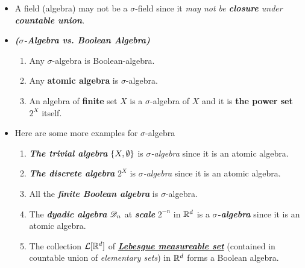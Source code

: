 \documentclass[11pt]{article}
\begin{document}
\begin{itemize}
\item \begin{remark}
A field (algebra) may not be a $\sigma$-field since it \emph{may not be \textbf{closure} under \textbf{countable union}}.
\end{remark}


\item \begin{remark} \emph{\textbf{($\sigma$-Algebra vs. Boolean Algebra)}}
\begin{enumerate}
\item \begin{proposition}
Any $\sigma$-algebra is Boolean-algebra. 
\end{proposition}

\item \begin{proposition}
Any \textbf{atomic algebra} is $\sigma$-algebra. 
\end{proposition}

\item  \begin{proposition}
An algebra of \textbf{finite} set $X$ is  a $\sigma$-algebra of $X$ and it is \textbf{the power set} $2^{X}$ itself. 
\end{proposition}
\end{enumerate}
\end{remark}

\item 
\begin{example} Here are some more examples for  $\sigma$-algebra \citep{tao2011introduction}
\begin{enumerate}
\item \emph{\textbf{The trivial algebra}} $\left\{X, \emptyset\right\}$ is \emph{$\sigma$-algebra} since it is an atomic algebra.

\item \emph{\textbf{The discrete algebra}} $2^{X}$ is \emph{$\sigma$-algebra} since it is an atomic algebra.

\item  All the \emph{\textbf{finite Boolean algebra}} is $\sigma$-algebra.

\item  The \emph{\textbf{dyadic algebra}} ${\mathscr D}_{n}$ at \textbf{\emph{scale}} $2^{-n}$ in ${\mathbb R}^d$ is a \emph{\textbf{$\sigma$-algebra}} since it is an atomic algebra.

\item The collection ${\mathcal L}[{\mathbb R}^{d}]$  of \underline{\emph{\textbf{Lebesgue measureable set}}}  (contained in countable union of \emph{elementary sets}) in ${\mathbb R}^{d}$ forms a Boolean algebra.


\end{enumerate}
\end{example}
\end{itemize}
\end{document}
